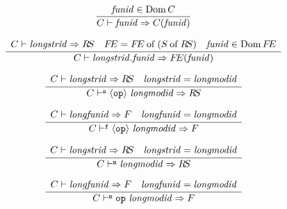 
\begin{equation}	%
\label{idlongfunid-rule}
\frac{\funid\in\Dom \C}
     {\C\ts\idlongid{\funid}\ra\C(\funid)}
\end{equation}

\begin{equation}	%
\label{dotlongfunid-rule}
\frac{\begin{array}{lcr}
      \C\ts\longstrid\ra\RS & 
      \FE = \of{\FE}{(\of{\S}{\RS})} &
      \funid\in\Dom\FE
      \end{array}
      }
     {\C\ts\dotlongid{\longstrid}{\funid}\ra\FE(\funid)}
\end{equation}


\begin{equation}	%
\label{strlongmodid-rule}
\frac{\begin{array}{lr}
	\C\ts\longstrid\ra\RS & \longstrid=\longmodid
      \end{array}}
     {\C\ts^\expectstr\opp\ \longmodid\ra\RS}
\end{equation}

\begin{equation}	%
\label{funlongmodid-rule}
\frac{\begin{array}{lr}
	\C\ts\longfunid\ra\F & \longfunid=\longmodid
      \end{array}}
     {\C\ts^\expectfun\opp\ \longmodid\ra\F}
\end{equation}

\begin{equation}	%
\label{longmodid-rule}
\frac{\begin{array}{lr}
	\C\ts\longstrid\ra\RS & \longstrid=\longmodid
      \end{array}}
     {\C\ts^\expectmod\longmodid\ra\RS}
\end{equation}

\begin{equation}	%
\frac{\begin{array}{lr}
	\C\ts\longfunid\ra\F & \longfunid=\longmodid
      \end{array}}
     {\C\ts^\expectmod\OP\ \longmodid\ra\F}
\end{equation}


